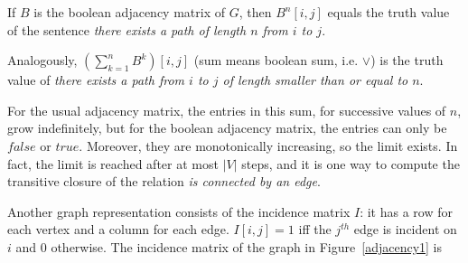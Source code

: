 If $B$ is the boolean adjacency matrix of $G$, then $B^{n}[i,j]$
equals the truth value of the sentence {\em there exists a path of
length $n$ from $i$ to $j$}.

Analogously, $(\sum_{k=1}^{n} B^{k})[i,j]$ (sum means boolean sum,
i.e. $\vee$) is the truth value of {\em there exists a path from $i$
to $j$ of length smaller than or equal to $n$}.

For the usual adjacency matrix, the entries in this sum, for
successive values of $n$, grow indefinitely, but for the boolean
adjacency matrix, the entries can only be $false$ or $true$. Moreover,
they are monotonically increasing, so the limit exists. In fact, the
limit is reached after at most $|V|$ steps, and it is one way to
compute the transitive closure of the relation {\em is connected by an
edge}.

Another graph representation consists of the incidence matrix $I$: it
has a row for each vertex and a column for each edge. $I[i,j] = 1$
iff the $j^{th}$ edge is incident on $i$ and 0 otherwise.  The
incidence matrix of the graph in Figure~\ref{adjacency1} is

